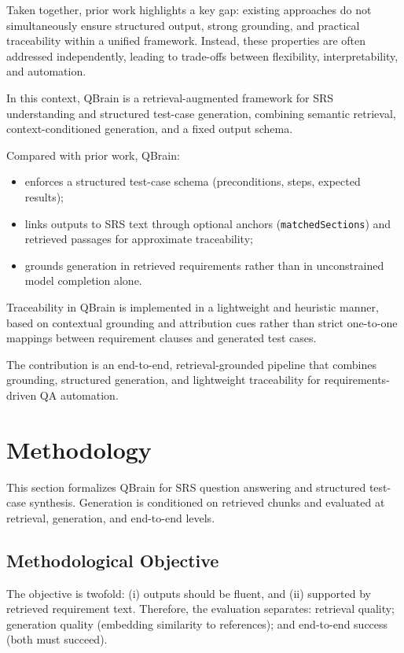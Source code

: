 \documentclass[conference]{IEEEtran}
\begin{document}
Taken together, prior work highlights a key gap: existing approaches do not simultaneously ensure structured output, strong grounding, and practical traceability within a unified framework. Instead, these properties are often addressed independently, leading to trade-offs between flexibility, interpretability, and automation.

In this context, QBrain is a retrieval-augmented framework for SRS understanding and structured test-case generation, combining semantic retrieval, context-conditioned generation, and a fixed output schema.

Compared with prior work, QBrain:
\begin{itemize}
\item enforces a structured test-case schema (preconditions, steps, expected results);
\item links outputs to SRS text through optional anchors (\texttt{matchedSections}) and retrieved passages for approximate traceability;
\item grounds generation in retrieved requirements rather than in unconstrained model completion alone.
\end{itemize}

Traceability in QBrain is implemented in a lightweight and heuristic manner, based on contextual grounding and attribution cues rather than strict one-to-one mappings between requirement clauses and generated test cases.

The contribution is an end-to-end, retrieval-grounded pipeline that combines grounding, structured generation, and lightweight traceability for requirements-driven QA automation.

\section{Methodology}
\label{sec:methodology}

This section formalizes QBrain for SRS question answering and structured test-case synthesis. Generation is conditioned on retrieved chunks and evaluated at retrieval, generation, and end-to-end levels.

\subsection{Methodological Objective}

The objective is twofold: (i) outputs should be fluent, and (ii) supported by retrieved requirement text. Therefore, the evaluation separates: retrieval quality; generation quality (embedding similarity to references); and end-to-end success (both must succeed).
\end{document}
